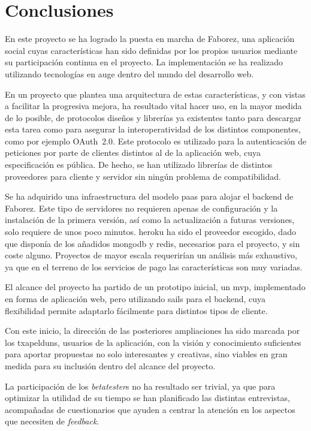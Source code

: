 \documentclass[main]{subfiles}
\begin{document}
\chapter{Conclusiones}

En este proyecto se ha logrado la puesta en marcha de Faborez, una aplicación social cuyas características han sido definidas por los propios usuarios mediante su participación continua en el proyecto. La implementación se ha realizado utilizando tecnologías en auge dentro del mundo del desarrollo web.

En un proyecto que plantea una arquitectura de estas características, y con vistas a facilitar la progresiva mejora, ha resultado vital hacer uso, en la mayor medida de lo posible, de protocolos diseños y librerías ya existentes tanto para descargar esta tarea como para asegurar la interoperatividad de los distintos componentes, como por ejemplo OAuth~2.0. Este protocolo es utilizado para la autenticación de peticiones por parte de clientes distintos al de la aplicación web, cuya especificación es pública. De hecho, se han utilizado librerías de distintos proveedores para cliente y servidor sin ningún problema de compatibilidad.

Se ha adquirido una infraestructura del modelo \acrlong{paas} para alojar el \gls{backend} de Faborez. Este tipo de servidores no requieren apenas de configuración y la instalación de la primera versión, así como la actualización a futuras versiones, solo requiere de unos poco minutos. \Gls{heroku} ha sido el proveedor escogido, dado que disponía de los añadidos \gls{mongodb} y \gls{redis}, necesarios para el proyecto, y sin coste alguno. Proyectos de mayor escala requerirían un análisis más exhaustivo, ya que en el terreno de los servicios de pago las características son muy variadas.

El alcance del proyecto ha partido de un prototipo inicial, un \acrlong{mvp}, implementado en forma de aplicación web, pero utilizando \gls{sails} para el \gls{backend}, cuya flexibilidad permite adaptarlo fácilmente para distintos tipos de cliente.

Con este inicio, la dirección de las posteriores ampliaciones ha sido marcada por los \glspl{txapeldun}, usuarios de la aplicación, con la visión y conocimiento suficientes para aportar propuestas no solo interesantes y creativas, sino viables en gran medida para su inclusión dentro del alcance del proyecto.

La participación de los \emph{betatester}s no ha resultado ser trivial, ya que para optimizar la utilidad de su tiempo se han planificado las distintas entrevistas, acompañadas de cuestionarios que ayuden a centrar la atención en los aspectos que necesiten de \emph{feedback}.
\end{document}
